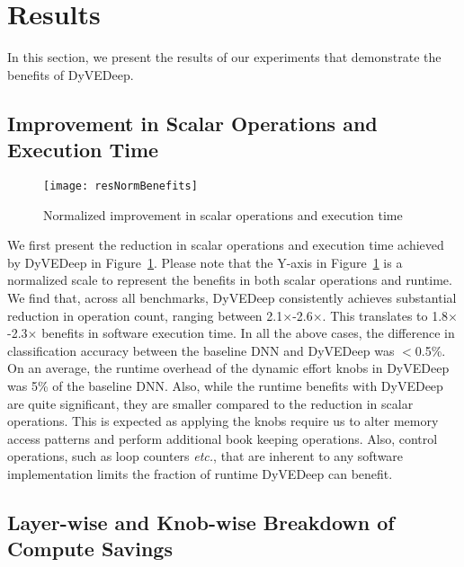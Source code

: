 \documentclass{article} %
\begin{document}
\section{Results} \label{sec:results}

In this section, we present the results of our experiments that demonstrate the benefits of DyVEDeep.

\subsection{Improvement in Scalar Operations and Execution Time}

\begin{figure}[htb]
\begin{center}
\texttt{[image: resNormBenefits]}
\end{center}
\caption{Normalized improvement in scalar operations and execution time}
\label{fig:resNormBenefits}
\end{figure}

We first present the reduction in scalar operations and execution time achieved by DyVEDeep in Figure~\ref{fig:resNormBenefits}. Please note that the Y-axis in Figure~\ref{fig:resNormBenefits} is a normalized scale to represent the benefits in both scalar operations and runtime. We find that, across all benchmarks, DyVEDeep consistently achieves substantial reduction in operation count, ranging between 2.1$\times$-2.6$\times$. This translates to 1.8$\times$-2.3$\times$ benefits in software execution time. In all the above cases, the difference in classification accuracy between the baseline DNN and DyVEDeep was $<$0.5\%. On an average, the runtime overhead of the dynamic effort knobs in DyVEDeep was 5\% of the baseline DNN. Also, while the runtime benefits with DyVEDeep are quite significant, they are smaller compared to the reduction in scalar operations. This is expected as applying the knobs require us to alter memory access patterns and perform additional book keeping operations. Also, control operations, such as loop counters \emph{etc.}, that are inherent to any software implementation limits the fraction of runtime DyVEDeep can benefit. 

\subsection{Layer-wise and Knob-wise Breakdown of Compute Savings}
\end{document}
